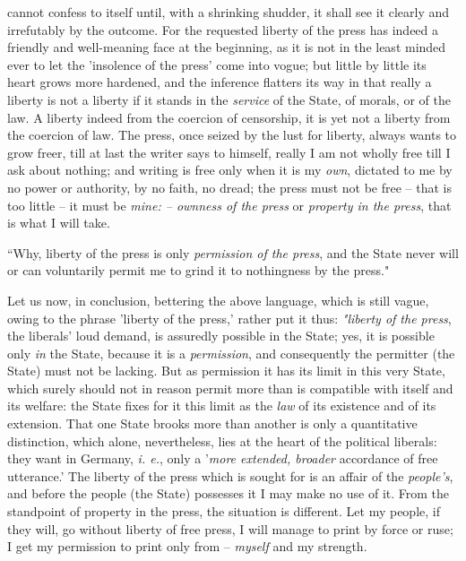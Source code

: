 cannot confess to itself until, with a shrinking shudder, it shall see it 
clearly and irrefutably by the outcome. For the requested liberty of the press 
has indeed a friendly and well-meaning face at the beginning, as it is not in 
the least minded ever to let the 'insolence of the press' come into vogue; but 
little by little its heart grows more hardened, and the inference flatters its 
way in that really a liberty is not a liberty if it stands in the 
\textit{service} of the State, of morals, or of the law. A liberty indeed from 
the coercion of censorship, it is yet not a liberty from the coercion of law. 
The press, once seized by the lust for liberty, always wants to grow freer, 
till at last the writer says to himself, really I am not wholly free till I 
ask about nothing; and writing is free only when it is my \textit{own}, 
dictated to me by no power or authority, by no faith, no dread; the press must 
not be free -- that is too little -- it must be \textit{mine: -- ownness of 
the press} or \textit{property in the press}, that is what I will take.

``Why, liberty of the press is only \textit{permission of the press}, and the 
State never will or can voluntarily permit me to grind it to nothingness by 
the press."{}

Let us now, in conclusion, bettering the above language, which is still vague, 
owing to the phrase 'liberty of the press,' rather put it thus: 
\textit{"{}liberty of the press}, the liberals' loud demand, is assuredly 
possible in the State; yes, it is possible only \textit{in} the State, because 
it is a \textit{permission}, and consequently the permitter (the State) must 
not be lacking. But as permission it has its limit in this very State, which 
surely should not in reason permit more than is compatible with itself and its 
welfare: the State fixes for it this limit as the \textit{law} of its 
existence and of its extension. That one State brooks more than another is 
only a quantitative distinction, which alone, nevertheless, lies at the heart 
of the political liberals: they want in Germany, \textit{i. e.}, only a 
'\textit{more extended, broader} accordance of free utterance.' The liberty of 
the press which is sought for is an affair of the \textit{people's}, and 
before the people (the State) possesses it I may make no use of it. From the 
standpoint of property in the press, the situation is different. Let my 
people, if they will, go without liberty of free press, I will manage to print 
by force or ruse; I get my permission to print only from -- \textit{myself} 
and my strength.

